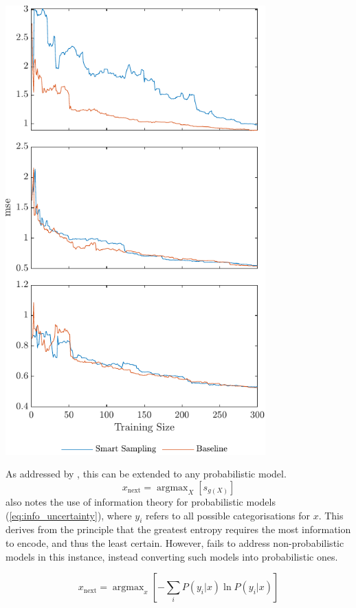 \documentclass[a4paper, english]{report}
\DeclareMathOperator*{\argmax}{argmax}
\begin{document}
\includegraphics[width=100mm]{US_300_all3.pdf}

As addressed by \textcite{LitRev_2009}, this can be extended to any probabilistic model.
\begin{equation}
    \label{eq:x_next1}
    x_\mathrm{next}=\argmax_X{\left[s_{g(X)}\right]}
\end{equation}
\textcite{LitRev_2009} also notes the use of information theory for probabilistic models (\ref{eq:info_uncertainty}), where $y_i$ refers to all possible categorisations for $x$. This derives from the principle that the greatest entropy requires the most information to encode, and thus the least certain. However, \textcite{LitRev_2009} fails to address non-probabilistic models in this instance, instead converting such models into probabilistic ones.

\begin{equation}
    \label{eq:info_uncertainty}
    x_\mathrm{next}=\argmax_x{\left[-\sum_i{P(y_i|x)\ln{P(y_i|x)}}\right]}
\end{equation}
\end{document}
